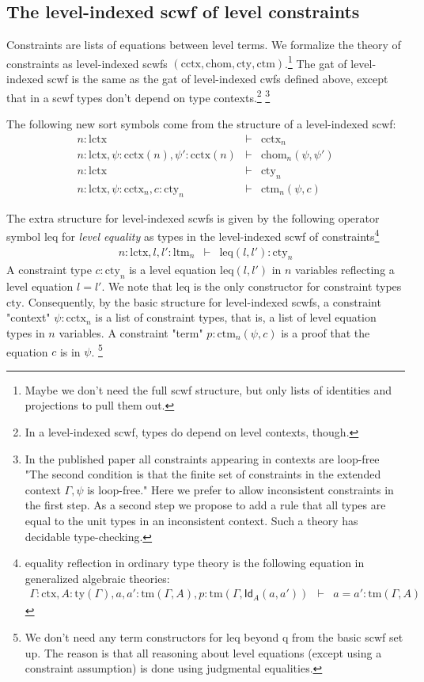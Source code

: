 \documentclass[11pt,a4paper]{article}
\theoremstyle{definition}
\newcommand{\Id}{\mathsf{Id}}
\def\lctx{\mathrm{lctx}}
\def\ltm{\mathrm{ltm}}
\def\leq{\mathrm{leq}}
\def\cctx{\mathrm{cctx}}
\def\cty{\mathrm{cty}}
\def\ctm{\mathrm{ctm}}
\def\chom{\mathrm{chom}}
\newcommand{\ctx}{\mathrm{ctx}}
\newcommand{\ty}{\mathrm{ty}}
\newcommand{\tm}{\mathrm{tm}}
\def\q{\mathrm{q}}
\begin{document}
\subsection{The level-indexed scwf of level constraints}

Constraints are lists of equations between level terms. We formalize the theory of constraints as level-indexed scwfs $(\cctx, \chom, \cty, \ctm)$.\footnote{Maybe we don't need the full scwf structure, but only lists of identities and projections to pull them out.} The gat of level-indexed scwf is the same as the gat of level-indexed cwfs defined above, except that in a scwf types don't depend on type contexts.\footnote{In a level-indexed scwf, types do depend on level contexts, though.} \footnote{In the published paper all constraints appearing in contexts are loop-free "The second condition is that the finite set of constraints in the extended context $\Gamma, \psi$ is loop-free." Here we prefer to allow inconsistent constraints in the first step. As a second step we propose to add a rule that all types are equal to the unit types in an inconsistent context. Such a theory has decidable type-checking.}

The following new sort symbols come from the structure of a level-indexed scwf:
\begin{eqnarray*}
n : \lctx &\vdash& \cctx_n\\
n : \lctx, \psi : \cctx(n), \psi' : \cctx(n) &\vdash& \chom_n(\psi,\psi')\\
n : \lctx &\vdash& \cty_n\\
n : \lctx, \psi : \cctx_n, c : \cty_n &\vdash& \ctm_n(\psi,c)
\end{eqnarray*}

The extra structure for level-indexed scwfs is given by the following operator symbol $\leq$ for {\em level equality} as types in the level-indexed scwf of constraints\footnote{equality reflection in ordinary type theory is the following equation in generalized algebraic theories:
\begin{eqnarray*}
\Gamma : \ctx, A : \ty(\Gamma), a, a' : \tm(\Gamma, A),p :  \tm(\Gamma,\Id_A(a,a'))&\vdash& a = a' : \tm(\Gamma,A)
\end{eqnarray*}
}
\begin{eqnarray*}
n : \lctx, l, l' : \ltm_n &\vdash& \leq(l,l') : \cty_n
\end{eqnarray*}
A constraint type $c : \cty_n$ is a level equation 
$\leq(l,l')$ in $n$ variables reflecting a level equation $l = l'$.
We note that $\leq$ is the only constructor for constraint types $\cty$. 
Consequently, by the basic structure for level-indexed scwfs,
a constraint "context" $\psi : \cctx_n$ is a list of constraint types, 
that is, a list of level equation types in $n$ variables. 
A constraint "term" $p : \ctm_n(\psi,c)$ is a proof that the equation $c$ is
in $\psi$.
\footnote{We don't need 
any term constructors for $\leq$ beyond $\q$ from the basic
scwf set up. The reason is that all reasoning about level equations 
(except using a constraint assumption) is done using judgmental equalities.} 
\end{document}
